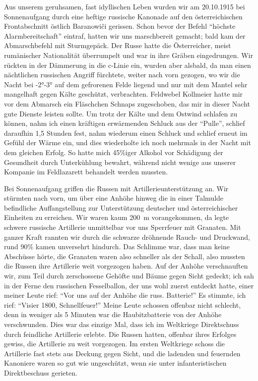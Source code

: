 Aus unserem geruhsamen, fast idyllischen Leben wurden wir am 20.10.1915 bei Sonnenaufgang durch eine heftige russische Kanonade auf den österreichischen Frontabschnitt östlich Baranowiči gerissen. Schon bevor der Befehl \enquote{höchste Alarmbereitschaft} eintraf, hatten wir uns marschbereit gemacht; bald kam der Abmarschbefehl mit Sturmgepäck. Der Russe hatte die Österreicher, meist rumänischer Nationalität überrumpelt und war in ihre Gräben eingedrungen. Wir rückten in der Dämmerung in die c-Linie ein, wurden aber alsbald, da man einen nächtlichen russischen Angriff fürchtete, weiter nach vorn gezogen, wo wir die Nacht bei -2°-3° auf dem gefrorenen Felde liegend und nur mit dem Mantel sehr mangelhaft gegen Kälte geschützt, verbrachten. Feldwebel Kollmeier hatte mir vor dem Abmarsch ein Fläschchen Schnaps zugeschoben, das mir in dieser Nacht gute Dienste leisten sollte. Um trotz der Kälte und dem Ostwind schlafen zu können, nahm ich einen kräftigen erwärmenden Schluck aus der \enquote{Pulle}, schlief daraufhin 1,5 Stunden fest, nahm wiederum einen Schluck und schlief erneut im Gefühl der Wärme ein, und dies wiederholte ich noch mehrmals in der Nacht mit dem gleichen Erfolg. So hatte mich 45\%iger Alkohol vor Schädigung der Gesundheit durch Unterkühlung bewahrt, während nicht wenige aus unserer Kompanie im Feldlazarett behandelt werden mussten.

Bei Sonnenaufgang griffen die Russen mit Artillerieunterstützung an. Wir stürmten nach vorn, um über eine Anhöhe hinweg die in einer Talmulde befindliche Auffangstellung zur Unterstützung deutscher und österreichischer Einheiten zu erreichen. Wir waren kaum 200~m vorangekommen, da legte schwere russische Artillerie unmittelbar vor uns Sperrfeuer mit Granaten. Mit ganzer Kraft rannten wir durch die schwarze dröhnende Rauch- und Druckwand, rund 90\% kamen unversehrt hindurch. Das Schlimme war, dass man keine Abschüsse hörte, die Granaten waren also schneller als der Schall, also mussten die Russen ihre Artillerie weit vorgezogen haben. Auf der Anhöhe verschnauften wir, zum Teil durch zerschossene Gehöfte und Bäume gegen Sicht gedeckt; ich sah in der Ferne den russischen Fesselballon, der uns wohl zuerst entdeckt hatte, einer meiner Leute rief: \enquote{Vor uns auf der Anhöhe die russ. Batterie!} Es stimmte, ich rief: \enquote{Visier 1800, Schnellfeuer!} Meine Leute schossen offenbar nicht schlecht, denn in weniger als 5 Minuten war die Haubitzbatterie von der Anhöhe verschwunden. Dies war das einzige Mal, dass ich im Weltkriege Direktschuss durch feindliche Artillerie erlebte. Die Russen hatten, offenbar ihres Erfolges gewiss, die Artillerie zu weit vorgezogen. Im ersten Weltkriege schoss die Artillerie fast stets aus Deckung gegen Sicht, und die ladenden und feuernden Kanoniere waren so gut wie ungeschützt, wenn sie unter infanteristischen Direktbeschuss gerieten.


